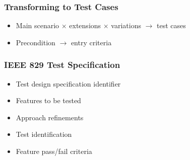 \begin{frame}
    \frametitle{Transforming to Test Cases}
    \begin{itemize}
        \item Main scenario $\times$ extensions $\times$ variations
            $\rightarrow$ test cases
        \item Precondition $\rightarrow$ entry criteria
    \end{itemize}
\end{frame}

\begin{frame}
    \frametitle{IEEE 829 Test Specification}
    \begin{itemize}
        \item Test design specification identifier
        \item Features to be tested
        \item Approach refinements
        \item Test identification
        \item Feature pass/fail criteria
    \end{itemize}
\end{frame}


